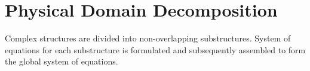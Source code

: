 \documentclass[../main.tex]{subfiles}
\begin{document}
 

\section{Physical Domain Decomposition} 

Complex structures are divided into non-overlapping substructures. 
System of equations for each substructure is formulated and subsequently assembled to form the global system of equations. 

 
 
 
 
\end{document}
